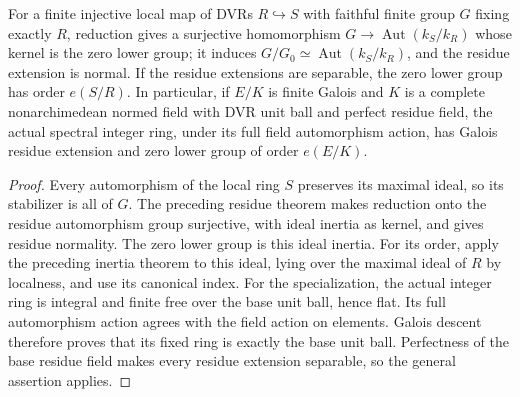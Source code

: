 \begin{lemma}
\label{fw:local-inertia-size}
\leanok
For a finite injective local map of DVRs $R\hookrightarrow S$ with
faithful finite group $G$ fixing exactly $R$, reduction gives a
surjective homomorphism $G\to\operatorname{Aut}(k_S/k_R)$ whose kernel
is the zero lower group; it induces
$G/G_0\simeq\operatorname{Aut}(k_S/k_R)$, and the residue extension is normal.
If the residue extensions are separable, the zero lower group has order
$e(S/R)$.
In particular, if $E/K$ is finite Galois and $K$ is a complete
nonarchimedean normed field with DVR unit ball and perfect residue
field, the actual spectral integer ring, under its full field
automorphism action, has Galois residue extension and zero lower group
of order $e(E/K)$.
\end{lemma}
\begin{proof}
Every automorphism of the local ring $S$ preserves its maximal ideal,
so its stabilizer is all of $G$. The preceding residue theorem makes
reduction onto the residue automorphism group surjective, with ideal
inertia as kernel, and gives residue normality. The zero lower group
is this ideal inertia. For its order, apply the preceding inertia theorem to this ideal, lying over the
maximal ideal of $R$ by localness, and use its canonical index.
For the specialization, the actual integer ring is integral and finite
free over the base unit ball, hence flat. Its full automorphism action
agrees with the field action on elements. Galois descent therefore
proves that its fixed ring is exactly the base unit ball. Perfectness
of the base residue field makes every residue extension separable,
so the general assertion applies.
\end{proof}

